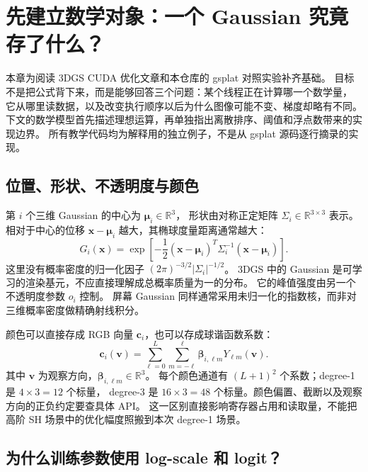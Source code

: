
\section{先建立数学对象：一个 Gaussian 究竟存了什么？}

本章为阅读 3DGS CUDA 优化文章和本仓库的 gsplat 对照实验补齐基础。
目标不是把公式背下来，而是能够回答三个问题：某个线程正在计算哪一个数学量，
它从哪里读数据，以及改变执行顺序以后为什么图像可能不变、梯度却略有不同。
下文的数学模型首先描述理想运算，再单独指出离散排序、阈值和浮点数带来的实现边界。
所有教学代码均为解释用的独立例子，不是从 gsplat 源码逐行摘录的实现。

\subsection{位置、形状、不透明度与颜色}

第 $i$ 个三维 Gaussian 的中心为 $\boldsymbol\mu_i\in\mathbb R^3$，
形状由对称正定矩阵 $\Sigma_i\in\mathbb R^{3\times3}$ 表示。
相对于中心的位移 $\mathbf x-\boldsymbol\mu_i$ 越大，其椭球度量距离通常越大：
\begin{equation}
 G_i(\mathbf x)=\exp\!\left[-\frac12
 (\mathbf x-\boldsymbol\mu_i)^T\Sigma_i^{-1}
 (\mathbf x-\boldsymbol\mu_i)\right].
\end{equation}
这里没有概率密度的归一化因子
$(2\pi)^{-3/2}|\Sigma_i|^{-1/2}$。
3DGS 中的 Gaussian 是可学习的渲染基元，不应直接理解成总概率质量为一的分布。
它的峰值强度由另一个不透明度参数 $o_i$ 控制。
屏幕 Gaussian 同样通常采用未归一化的指数核，而非对三维概率密度做精确射线积分。

颜色可以直接存成 RGB 向量 $\mathbf c_i$，也可以存成球谐函数系数：
\begin{equation}
 \mathbf c_i(\mathbf v)=\sum_{\ell=0}^{L}\sum_{m=-\ell}^{\ell}
 \boldsymbol\beta_{i,\ell m}Y_{\ell m}(\mathbf v).
\end{equation}
其中 $\mathbf v$ 为观察方向，$\boldsymbol\beta_{i,\ell m}\in\mathbb R^3$。
每个颜色通道有 $(L+1)^2$ 个系数；degree-1 是 $4\times3=12$ 个标量，
degree-3 是 $16\times3=48$ 个标量。颜色偏置、截断以及观察方向的正负约定要查具体 API。
这一区别直接影响寄存器占用和读取量，不能把高阶 SH 场景中的优化幅度照搬到本次 degree-1 场景。

\subsection{为什么训练参数使用 log-scale 和 logit？}

